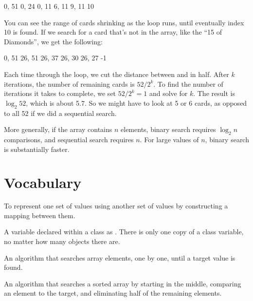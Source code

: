 \begin{stdout}
0, 51
0, 24
0, 11
6, 11
9, 11
10
\end{stdout}

You can see the range of cards shrinking as the  loop runs, until eventually index 10 is found.
If we search for a card that's not in the array, like  the ``15 of Diamonds'', we get the following:

\begin{stdout}
0, 51
26, 51
26, 37
26, 30
26, 27
-1
\end{stdout}

%

Each time through the loop, we cut the distance between  and  in half.
After $k$ iterations, the number of remaining cards is $52 / 2^k$.
To find the number of iterations it takes to complete, we set $52 / 2^k = 1$ and solve for $k$.
The result is $\log_2 52$, which is about 5.7.
So we might have to look at 5 or 6 cards, as opposed to all 52 if we did a sequential search.

More generally, if the array contains $n$ elements, binary search requires $\log_2 n$ comparisons, and sequential search requires $n$.
For large values of $n$, binary search is substantially faster.


\section{Vocabulary}

\begin{description}

To represent one set of values using another set of values by constructing a mapping between them.

A variable declared within a class as .
There is only one copy of a class variable, no matter how many objects there are.

An algorithm that searches array elements, one by one, until a target value is found.

An algorithm that searches a sorted array by starting in the middle, comparing an element to the target, and eliminating half of the remaining elements.

\end{description}



